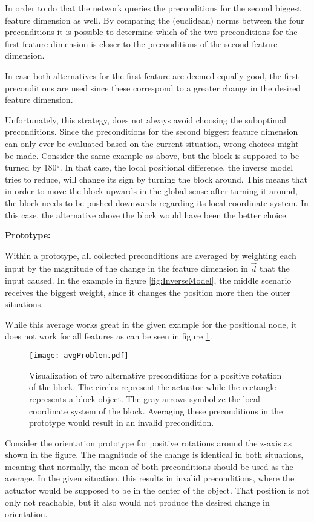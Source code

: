 In order to do that the network queries the preconditions for the second biggest feature dimension as well. By comparing the (euclidean) norms between the four preconditions it is possible to determine which of the two preconditions for the first feature dimension is closer to the preconditions of the second feature dimension.  

In case both alternatives for the first feature are deemed equally good, the first preconditions are used since these correspond to a greater change in the desired feature dimension.

Unfortunately, this strategy, does not always avoid choosing the suboptimal preconditions. Since the preconditions for the second biggest feature dimension can only ever be evaluated based on the current situation, wrong choices might be made. Consider the same example as above, but the block is supposed to be turned by 180°. In that case, the local positional difference, the inverse model tries to reduce, will change its sign by turning the block around. This means that in order to move the block upwards in the global sense after turning it around, the block needs to be pushed downwards regarding its local coordinate system. In this case, the alternative above the block would have been the better choice.

\textbf{Prototype:}

Within a prototype, all collected preconditions are averaged by weighting each input by the magnitude of the change in the feature dimension in $\vec{d}$ that the input caused.
In the example in figure \ref{fig:InverseModel}, the middle scenario receives the biggest weight, since it changes the position more then the outer situations. 

While this average works great in the given example for the positional node, it does not work for all features as can be seen in figure \ref{fig:avgProblem}.

\begin{figure}
	\centering
	\texttt{[image: avgProblem.pdf]}
	\caption{Visualization of two alternative preconditions for a positive rotation of the block. The circles represent the actuator while the rectangle represents a block object. The gray arrows symbolize the local coordinate system of the block. Averaging these preconditions in the prototype would result in an invalid precondition.} 
	\label{fig:avgProblem}
\end{figure}

Consider the orientation prototype for positive rotations around the z-axis as shown in the figure. The magnitude of the change is identical in both situations, meaning that normally, the mean of both preconditions should be used as the average. In the given situation, this results in invalid preconditions, where the actuator would be supposed to be in the center of the object. That position is not only not reachable, but it also would not produce the desired change in orientation. 

